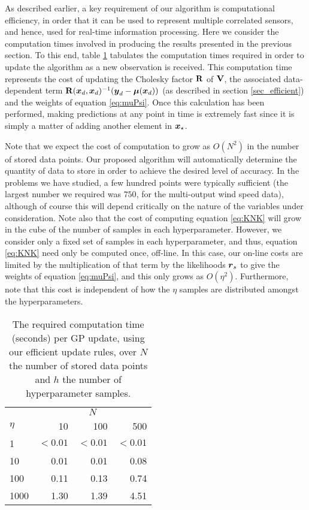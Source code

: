 \documentclass{acmtrans2m}
\begin{document}
\noindent As described earlier, a key requirement of our algorithm is computational efficiency, in order that it can be used to represent multiple correlated sensors, and hence, used for real-time information processing. Here we consider the computation times involved in producing the results presented in the previous section. To this end, table \ref{tbl:comp_speed}  tabulates the computation times required in order to update the algorithm as a new observation is received. This computation time represents the cost of updating the Cholesky factor $\mathbf{R}$ of $\mathbf{V}$, the associated data-dependent term $\mathbf{R}(\boldsymbol{x}_d,\boldsymbol{x}_d)^{-1}(\boldsymbol{y}_d-\boldsymbol{\mu}(\boldsymbol{x}_d))$ (as described in section \ref{sec_efficient}) and the weights of equation \eqref{eq:muPsi}. Once this calculation has been performed, making predictions at any point in time is extremely fast since it is simply a matter of adding another element in $\boldsymbol{x}_\star$.

Note that we expect the cost of computation to grow as $O(N^2)$ in the number of stored data points. Our proposed algorithm will automatically determine the quantity of data to store in order to achieve the desired level of accuracy. In the problems we have studied, a few hundred points were typically sufficient (the largest number we required was $750$, for the multi-output wind speed data), although of course this will depend critically on the nature of the variables under consideration. Note also that the cost of computing equation \eqref{eq:KNK} will grow in the cube of the number of samples in each hyperparameter. However, we consider only a fixed set of samples in each hyperparameter, and thus, equation \eqref{eq:KNK} need only be computed once, off-line. In this case, our on-line costs are limited by the multiplication of that term by the likelihoods $\boldsymbol{r}_s$ to give the weights of equation \eqref{eq:muPsi}, and this only grows as $O(\eta^2)$. Furthermore, note that this cost is independent of how the $\eta$ samples are distributed amongst the hyperparameters.

\begin{table}
\centering
\caption{The required computation time (seconds) per GP update, using our efficient update rules, over $N$ the number of stored data points and $h$ the number of hyperparameter samples. } 
\label{tbl:comp_speed} 
\begin{tabular}{@{}lrrr@{}}
\toprule
& \multicolumn{3}{c}{$N$}\\
\cmidrule(l){2-4}
$\eta$ & 10 & 100 & 500 \\
\midrule
1 & $<0.01$ & $<0.01$ & $<0.01$\\ 
10 & 0.01 & 0.01 & 0.08 \\
100 & 0.11 & 0.13 & 0.74 \\ 
1000 & 1.30 & 1.39 & 4.51 \\
\bottomrule
\end{tabular}
\end{table}
\end{document}
